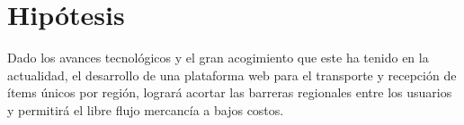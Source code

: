 \section{Hipótesis}

{Dado los avances tecnológicos y el gran acogimiento que este ha tenido en la actualidad, el desarrollo de una plataforma web para el transporte y recepción de ítems únicos por región, logrará acortar las barreras regionales entre los usuarios y permitirá el libre flujo mercancía a bajos costos.}